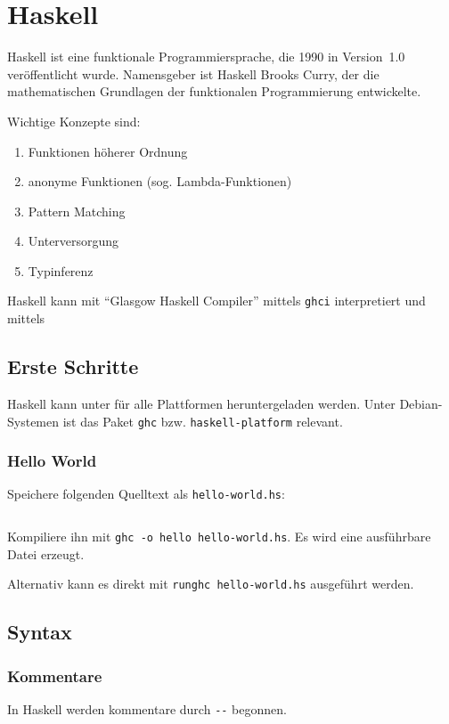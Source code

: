 \chapter{Haskell}
Haskell ist eine funktionale Programmiersprache, die 1990 in Version~1.0 veröffentlicht 
wurde. Namensgeber ist Haskell Brooks Curry, der die mathematischen Grundlagen der funktionalen Programmierung entwickelte.

Wichtige Konzepte sind:
\begin{enumerate}
    \item Funktionen höherer Ordnung
    \item anonyme Funktionen (sog. Lambda-Funktionen)
    \item Pattern Matching
    \item Unterversorgung
    \item Typinferenz
\end{enumerate}

Haskell kann mit \enquote{Glasgow Haskell Compiler} mittels 
\texttt{ghci} interpretiert und mittels 

\section{Erste Schritte}
Haskell kann unter \href{http://www.haskell.org/platform/}{}
für alle Plattformen heruntergeladen werden. Unter Debian-Systemen
ist das Paket \texttt{ghc} bzw. \texttt{haskell-platform} relevant.

\subsection{Hello World}
Speichere folgenden Quelltext als \texttt{hello-world.hs}:
\inputminted[linenos, numbersep=5pt, tabsize=4, frame=lines, label=hello-world.hs]{haskell}{scripts/haskell/hello-world.hs}

Kompiliere ihn mit \texttt{ghc -o hello hello-world.hs}. Es wird eine
ausführbare Datei erzeugt.

Alternativ kann es direkt mit \texttt{runghc hello-world.hs} ausgeführt werden.

\section{Syntax}
\subsection{Kommentare}
In Haskell werden kommentare durch \verb+--+ begonnen.

